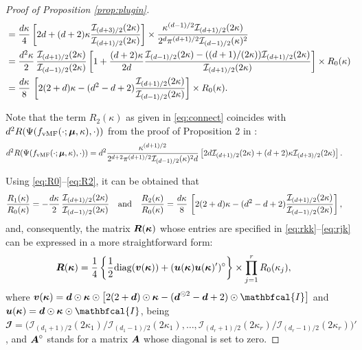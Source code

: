 \documentclass[oneside,11pt]{article}
\begin{document}
\begin{proof}[Proof of Proposition \ref{prop:plugin}]
\begin{align}
    &=\frac{d\kappa}{4}\left[2d+(d+2)\kappa \frac{\mathcal{I}_{(d+3)/2}(2\kappa)}{\mathcal{I}_{(d+1)/2}(2\kappa)}\right]\times\frac{\kappa^{(d-1)/2} \mathcal{I}_{(d+1)/2}(2\kappa)}{2^{d}\pi^{(d+1)/2}\mathcal{I}_{(d-1)/2}(\kappa)^2}\nonumber\\
    &= \frac{d^2\kappa}{2}\, \frac{\mathcal{I}_{(d+1)/2}(2\kappa)}{\mathcal{I}_{(d-1)/2}(2\kappa)} \left[1+\frac{(d+2)\kappa}{2d} \frac{\mathcal{I}_{(d-1)/2}(2\kappa)-((d+1)/(2\kappa)) \mathcal{I}_{(d+1)/2}(2\kappa)}{\mathcal{I}_{(d+1)/2}(2\kappa)}\right]\times R_0(\kappa)\nonumber\\
    &= \frac{d\kappa}{8}\, \left[2(2+d)\kappa-(d^2-d+2)\frac{\mathcal{I}_{(d+1)/2}(2\kappa)}{\mathcal{I}_{(d-1)/2}(2\kappa)}\right]\times R_0(\kappa).\label{eq:R2}
\end{align}

Note that the term $R_2(\kappa)$ as given in \eqref{eq:connect} coincides with $d^2 R(\Psi(f_{\mathrm{vMF}}(\cdot ;\boldsymbol\mu, \kappa), \cdot))$ from the proof of Proposition 2 in \cite{Garcia-Portugues2013a}:
\begin{align*}
    d^2 R(\Psi(f_{\mathrm{vMF}}(\cdot ;\bmu, \kappa), \cdot))&=d^2 \frac{\kappa^{(d+1)/2}}{2^{d+2} \pi^{(d+1)/2} \mathcal{I}_{(d-1)/2}(\kappa)^2 d}\left[2 d \mathcal{I}_{(d+1)/2}(2 \kappa)+(d+2) \kappa \mathcal{I}_{(d+3)/2}(2 \kappa)\right].%
\end{align*}

Using \eqref{eq:R0}--\eqref{eq:R2}, it can be obtained that
\begin{align*}
    \frac{R_1(\kappa)}{R_0(\kappa)}&=-\frac{d\kappa}{2}\, \frac{\mathcal{I}_{(d+1)/2}(2\kappa)}{\mathcal{I}_{(d-1)/2}(2\kappa)}\quad\text{and}\quad\frac{R_2(\kappa)}{R_0(\kappa)}= \frac{d\kappa}{8}\, \left[2(2+d)\kappa-(d^2-d+2)\frac{\mathcal{I}_{(d+1)/2}(2\kappa)}{\mathcal{I}_{(d-1)/2}(2\kappa)}\right],
\end{align*}
and, consequently, the matrix $\boldsymbol{R}(\boldsymbol\kappa)$ whose entries are specified in \eqref{eq:rkk}--\eqref{eq:rjk} can be expressed in a more straightforward form:
\begin{align*}
    \boldsymbol{R}(\boldsymbol\kappa)&=\frac{1}{4}\left\{\frac{1}{2}\mathrm{diag}(\boldsymbol{v}(\boldsymbol\kappa))+(\boldsymbol{u}(\boldsymbol\kappa)\boldsymbol{u}(\boldsymbol\kappa)')^\circ\right\}\times\prod_{j=1}^{r} R_0(\kappa_j),
\end{align*}
where $\bv(\bkappa)= \bd\odot\bkappa\odot\lrc{2(2+\bd)\odot\bkappa-(\bd^{\odot 2}-\bd+2)\odot\mathbfcal{I}}$ and $\bu(\bkappa)=\bd\odot\bkappa\odot\mathbfcal{I}$, being $\mathbfcal{I}=\big(\mathcal{I}_{(d_1+1)/2}(2\kappa_1)\big/\mathcal{I}_{(d_1-1)/2}(2\kappa_1),\ldots,\mathcal{I}_{(d_r+1)/2}(2\kappa_r)\big/\mathcal{I}_{(d_r-1)/2}(2\kappa_r)\big)'$, and $\boldsymbol{A}^\circ$ stands for a matrix $\boldsymbol{A}$ whose diagonal is set to zero.


\end{proof}
\end{document}
